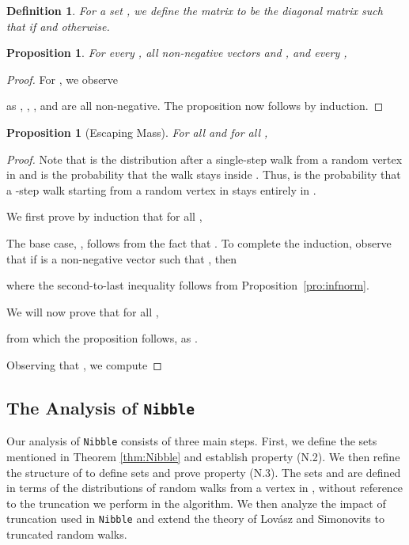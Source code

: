 \documentclass[11pt]{article}
\newtheorem{proposition}[theorem]{Proposition}
\newtheorem{definition}[theorem]{Definition}
\begin{document}
\begin{definition}\label{def:DS}
For a set , we define the matrix  to be
  the diagonal matrix such that
   if  and  otherwise.
\end{definition}

\begin{proposition}\label{pro:DS}
For every , all
 non-negative vectors  and ,
  and every ,

\end{proposition}
\begin{proof}
For , we observe

as , ,  , and  are all non-negative.
The proposition now follows by induction.
\end{proof}

\begin{proposition}[Escaping Mass]\label{pro:isopLeaving}
For all  and for all ,

\end{proposition}
\begin{proof}
Note that  is the distribution after
  a single-step walk from a random vertex in 
  and 
  is the probability that the walk stays inside .
Thus, 
  is the probability that a -step walk starting
  from a random vertex in  stays entirely in .

We first prove by induction that for all ,

The base case, , follows from the fact that
  .
To complete the induction, observe that if
   is a non-negative vector such that
  , then

where the second-to-last inequality follows from
  Proposition~\ref{pro:infnorm}.

We will now prove that for all ,

from which the proposition follows, as .

Observing that ,
  we compute

\end{proof}



\subsection{The Analysis of \texttt{Nibble}}

Our analysis of \texttt{Nibble} consists of three main steps.
First, we define the sets  mentioned in
  Theorem \ref{thm:Nibble} and establish property (N.2).
We then refine the structure of  to
  define sets  and prove property (N.3).
The sets  and  are defined in terms
  of the distributions of
  random walks from a vertex in , without reference to the
  truncation we perform in the algorithm.
We then analyze the impact of truncation used in \texttt{Nibble}
  and extend the theory of Lov\'asz and Simonovits \cite{LovaszSimonovits}
  to truncated random walks.
\end{document}
